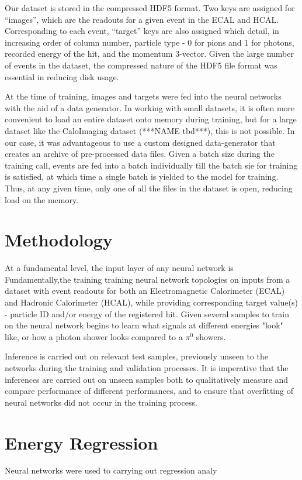 \documentclass[twocolumn,aps,prd,reprint,superscriptaddress]{revtex4-1}
\newcommand{\q}[1]{``#1''}
\begin{document}
	Our dataset is stored in the compressed HDF5 format. Two keys are assigned for \q{images}, which are the readouts for a given event in the ECAL and HCAL. Corresponding to each event, \q{target} keys are also assigned which detail, in increasing order of column number, particle type - 0 for pions and 1 for photons, recorded energy of the hit, and the momentum 3-vector. Given the large number of events in the dataset, the compressed nature of the HDF5 file format was essential in reducing disk usage.
	
	At the time of training, images and targets were fed into the neural networks with the aid of a data generator. In working with small datasets, it is often more convenient to load an entire dataset onto memory during training, but for a large dataset like the CaloImaging dataset (***NAME tbd***), this is not possible. In our case, it was advantageous to use a custom designed data-generator that creates an archive of pre-processed data files. Given a batch size during the training call, events are fed into a batch individually till the batch sie for training is satisfied, at which time a single batch is yielded to the model for training. Thus, at any given time, only one of all the files in the dataset is open, reducing load on the memory. 
	
	\section{Methodology}
	
	At a fundamental level, the input layer of any neural network is 
	Fundamentally,the training  training neural network topologies on inputs from a dataset with event readouts for both an Electromagnetic Calorimeter (ECAL) and Hadronic Calorimeter (HCAL), while providing corresponding target value(s) - particle ID and/or energy of the registered hit. Given several samples to train on the neural network begins to learn what signals at different energies "look" like, or how a photon shower looks compared to a $\pi^0$ showers.\par 
	Inference is carried out on relevant test samples, previously unseen to the networks during the training and validation processes. It is imperative that the inferences are carried out on unseen samples both to qualitatively measure and compare performance of different performances, and to ensure that overfitting of neural networks did not occur in the training process. 	
	
	
	\section{Energy Regression}
	Neural networks were used to carrying out regression analy
	
\end{document}
